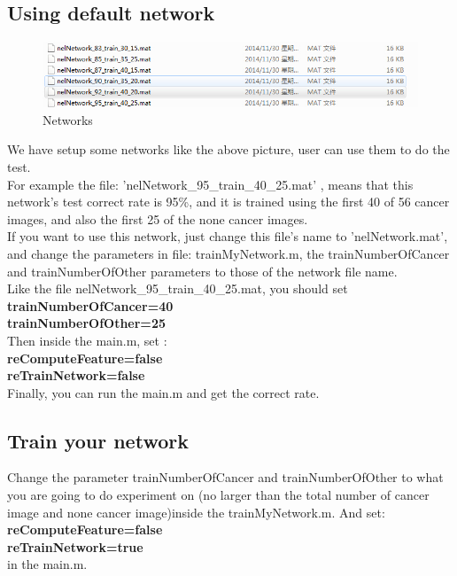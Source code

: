 \documentclass[14pt]{report} %
\begin{document}
	\subsection{Using default network}	
	\begin{figure}[H]
		\includegraphics[width=\textwidth]{image/networkSave.jpg} 
		\caption{Networks} 
		 \label{fig:networkSave} 
	\end{figure}
	We have setup some networks like the above picture, user can use them to do the test. 
	\\For example the file: 'nelNetwork\_95\_train\_40\_25.mat' , means that this network's test correct rate is 95\%, and it is trained using the first 40 of 56 cancer images, and also the first 25 of the none cancer images.
	\\If you want to use this network, just change this file's name to 'nelNetwork.mat', and change the parameters in file: trainMyNetwork.m, the trainNumberOfCancer and trainNumberOfOther parameters to those of the network file name. 		\\Like the file nelNetwork\_95\_train\_40\_25.mat, you should set \\
	\textbf{
	trainNumberOfCancer=40 
	\\trainNumberOfOther=25}
	\\ Then inside the main.m, set :\\
	\textbf{
	reComputeFeature=false
	\\reTrainNetwork=false}
	\\Finally, you can run the main.m and get the correct rate.
	\subsection{Train your network}
	Change the parameter trainNumberOfCancer and trainNumberOfOther to what you are going to do experiment on (no larger than the total number of cancer image and none cancer image)inside the trainMyNetwork.m. And set:	\\
	\textbf{
		reComputeFeature=false 
		\\reTrainNetwork=true
	}
	\\in the main.m.
\end{document}

